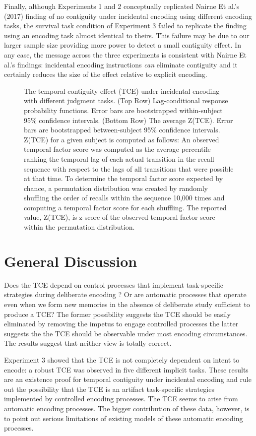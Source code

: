 \documentclass[jou,natbib,floatsintext]{apa6} %
\begin{document}
Finally, although Experiments 1 and 2 conceptually replicated Nairne Et al.'s (2017) finding of no contiguity under incidental encoding using different encoding tasks, the survival task condition of Experiment 3 failed to replicate the finding using an encoding task almost identical to theirs. This failure may be due to our larger sample size providing more power to detect a small contiguity effect. In any case, the message across the three experiments is consistent with Nairne Et al.'s findings: incidental encoding instructions \emph{can} eliminate contiguity and it certainly reduces the size of the effect relative to explicit encoding. 

\begin{figure*}%
\caption{The temporal contiguity effect (TCE) under incidental encoding with different judgment tasks. (Top Row) Lag-conditional response probability functions. Error bars are bootstrapped within-subject 95\% confidence intervals. (Bottom Row) The average Z(TCE).  Error bars are bootstrapped between-subject 95\% confidence intervals. Z(TCE) for a given subject is computed as follows: An observed temporal factor score was computed as the average percentile ranking the temporal lag of each actual transition in the recall sequence with respect to the lags of all transitions that were possible at that time. To determine the temporal factor score expected by chance, a permutation distribution was created by randomly shuffling the order of recalls within the sequence 10,000 times and computing a temporal factor score for each shuffling. The reported value, Z(TCE), is z-score of the observed temporal factor score within the permutation distribution.}
\label{E3}
\end{figure*}

\section{General Discussion}
Does the TCE depend on control processes that implement task-specific strategies during deliberate encoding \citep{Hint16}? Or are automatic processes that operate even when we form new memories in the absence of deliberate study sufficient to produce a TCE? The former possibility suggests the TCE should be easily eliminated by removing the impetus to engage controlled processes the latter suggests the the TCE should be observable under most encoding circumstances. The results suggest that neither view is totally correct.

Experiment 3 showed that the TCE is not completely dependent on intent to encode: a robust TCE was observed in five different implicit tasks. These results are an existence proof for temporal contiguity under incidental encoding and rule out the possibility that the TCE is an artifact task-specific strategies implemented by controlled encoding processes. The TCE seems to arise from automatic encoding processes. The bigger contribution of these data, however, is to point out serious limitations of existing models of these automatic encoding processes. 
\end{document}
